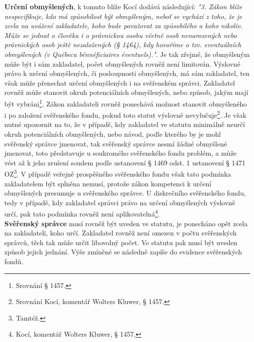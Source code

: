 \documentclass{article}
\begin{document}
\textbf{Určení obmyšlených}, k tomuto blíže Kocí dodává následující: \textit{"3. Zákon blíže nespecifikuje, kdo má způsobilost být obmyšleným, neboť se vychází z toho, že je zcela na uvážení zakladatele, koho bude považovat za způsobilého a koho nikoliv. Může se jednat o člověka i o právnickou osobu včetně osob nenarozených nebo právnických osob ještě nezaložených (§ 1464), kdy hovoříme o tzv. eventuálních obmyšlených (v Québecu bénnéficiaires éventuels)."}. Je tak zřejmé, že obmyšleným může být i sám zakladatel, počet obmyšlených rovněž není limitován. Výslovné právo k určení obmyšlených, či posloupnosti obmyšlených, má sám zakladatel, ten však může přenechat určení obmyšlených i na svěřenském správci. Zakladatel rovněž může stanovit okruh potenciálních obmyšlených, nebo způsob, jakým mají být vybráni\footnote{Srovnání § 1457.}. Zákon zakladateli rovněž ponechává možnost stanovit obmyšleného i po založení svěřenského fondu, pokud toto statut výslovně nevylučuje\footnote{Srovnání Kocí, komentář Wolters Kluwer, § 1457.}. Je však nutné upozornit na to, že v případě, kdy zakladatel ve statutu minimálně neurčí okruh potenciálních obmyšlených, nebo návod, podle kterého by je mohl svěřenský správce jmenovat, tak svěřenský správce nesmí žádné obmyšlené jmenovat, toto představuje u soukromého svěřenského fondu problém, a může vést až k jeho zrušení soudem podle ustanovení § 1469 odst. 1 ustanovení § 1471 OZ\footnote{Tamtéž.}. V případě veřejně prospěšného svěřenského fondu však tato podmínka zakladatelem být splněna nemusí, protože zákon kompetenci k určení obmyšlených presumuje u svěřenského správce. U diskrečního svěřenského fondu, tedy v případě, kdy zakladatel správci právo na určení obmyšlených výslovně určí, pak tato podmínka rovněž není aplikovatelná\footnote{Kocí, komentář Wolters Kluwer, § 1457.}.\\

\textbf{Svěřenský správce} musí rovněž být uveden ve statutu, je ponecháno opět zcela na zakladateli, koho určí. Zakladatel rovněž není omezen v počtu svěřenských správců, těch tak může určit libovolný počet. Ve statutu pak musí být uveden způsob jejich jednání. Výše zmíněné se následně zapíše do evidence svěřenských fondů.\\

 
\end{document}
